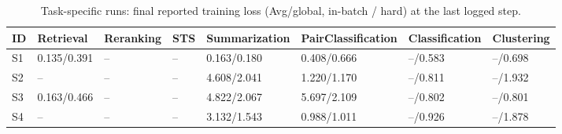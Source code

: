 \begin{table}[ht]
\centering
\small
\setlength{\tabcolsep}{4pt}
\caption{Task-specific runs: final reported training loss (Avg/global, in-batch / hard) at the last logged step.}
\label{tab:ts-train-loss}
\begin{tabular}{llllllll}
\toprule
ID & Retrieval & Reranking & STS & Summarization & PairClassification & Classification & Clustering \\
\midrule
S1 & 0.135/0.391 & -- & -- & 0.163/0.180 & 0.408/0.666 & --/0.583 & --/0.698 \\
S2 & -- & -- & -- & 4.608/2.041 & 1.220/1.170 & --/0.811 & --/1.932 \\
S3 & 0.163/0.466 & -- & -- & 4.822/2.067 & 5.697/2.109 & --/0.802 & --/0.801 \\
S4 & -- & -- & -- & 3.132/1.543 & 0.988/1.011 & --/0.926 & --/1.878 \\
\bottomrule
\end{tabular}
\end{table}

